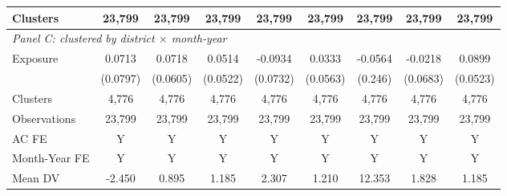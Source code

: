 {\begin{tabular}{l*{8}{c}}
Clusters    &      23,799         &      23,799         &      23,799         &      23,799         &      23,799         &      23,799         &      23,799         &      23,799         \\
\midrule

\multicolumn{9}{l}{\textit{Panel C: clustered by district $\times$ month-year}} \\
Exposure    &      0.0713         &      0.0718         &      0.0514         &     -0.0934         &      0.0333         &     -0.0564         &     -0.0218         &      0.0899\sym{*}  \\
            &    (0.0797)         &    (0.0605)         &    (0.0522)         &    (0.0732)         &    (0.0563)         &     (0.246)         &    (0.0683)         &    (0.0523)         \\

Clusters    &       4,776         &       4,776         &       4,776         &       4,776         &       4,776         &       4,776         &       4,776         &       4,776         \\
\midrule



Observations&      23,799&      23,799&      23,799&      23,799&      23,799&      23,799&      23,799&      23,799\\
AC FE       &           Y&           Y&           Y&           Y&           Y&           Y&           Y&           Y\\
Month-Year FE&           Y&           Y&           Y&           Y&           Y&           Y&           Y&           Y\\
Mean DV     &      -2.450&       0.895&       1.185&       2.307&       1.210&      12.353&       1.828&       1.185\\
\bottomrule
\end{tabular}
}
